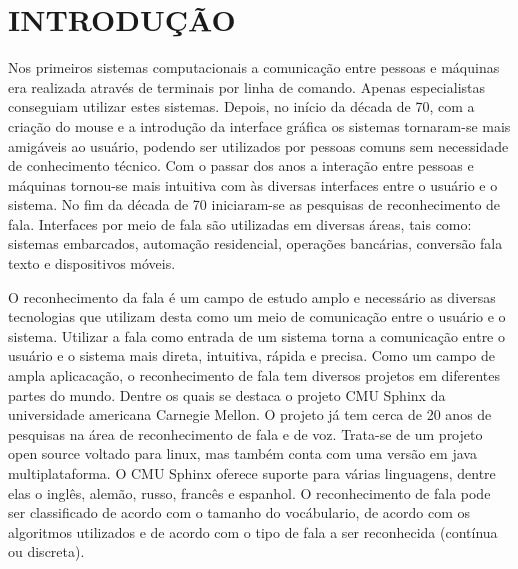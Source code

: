 \chapter{INTRODUÇÃO}
\label{chap:introducao}
 \thispagestyle{plain}


\quad Nos primeiros sistemas computacionais a comunicação entre pessoas e máquinas era realizada através de terminais por linha de comando.  Apenas especialistas conseguiam utilizar estes sistemas.
Depois, no início da década de 70, com a criação do mouse e a introdução da interface gráfica  os sistemas tornaram-se mais amigáveis ao usuário, podendo ser utilizados por pessoas comuns sem necessidade de conhecimento técnico. Com o passar dos anos a interação entre pessoas e máquinas tornou-se mais intuitiva com às diversas interfaces entre o usuário e o sistema. No fim da década de 70 iniciaram-se as pesquisas de reconhecimento de fala.
Interfaces por meio de fala são utilizadas em diversas áreas, tais como: sistemas embarcados, automação residencial, operações bancárias, conversão fala texto e dispositivos móveis.

\quad O reconhecimento da fala é um campo de estudo amplo e necessário as diversas tecnologias que utilizam
desta como um  meio de comunicação entre o usuário e o sistema. Utilizar a fala como entrada de um sistema
torna a comunicação entre o usuário e o sistema mais direta, intuitiva, rápida e precisa. Como um campo de ampla aplicacação, o reconhecimento de fala tem diversos projetos em diferentes partes do mundo. Dentre os quais se destaca o projeto CMU Sphinx da universidade americana Carnegie Mellon. O projeto já tem cerca de 20 anos de pesquisas na área de reconhecimento de fala e de voz. Trata-se de um projeto open source voltado para linux, mas também conta com uma versão em java multiplataforma. O CMU Sphinx oferece suporte para várias linguagens, dentre elas o inglês, alemão, russo, francês e espanhol. 
O reconhecimento de fala pode ser classificado de acordo com o tamanho do vocábulario, de acordo com os algoritmos utilizados e de acordo com o tipo de fala a ser reconhecida (contínua ou discreta).




